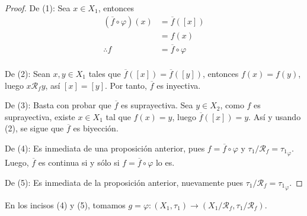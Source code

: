 \documentclass[12pt]{report}
\theoremstyle{largebreak}
\newcommand\cf[3]{\ensuremath{#1:#2\rightarrow#3}}
\begin{document}
    \begin{proof}
        De (1): Sea $x\in X_1$, entonces
        \begin{equation*}
            \begin{split}
                (\overline{f}\circ\varphi)(x)&=\overline{f}([x])\\
                &=f(x)\\
                \therefore f&=\overline{f}\circ\varphi\\
            \end{split}
        \end{equation*}

        De (2): Sean $x,y\in X_1$ tales que $\overline{f}([x])=\overline{f}([y])$, entonces $f(x)=f(y)$, luego $x\mathcal{R}_fy$, así $[x]=[y]$. Por tanto, $\overline{f}$ es inyectiva.

        De (3): Basta con probar que $\overline{f}$ es suprayectiva. Sea $y\in X_2$, como $f$ es suprayectiva, existe $x\in X_1$ tal que $f(x)=y$, luego $\overline{f}([x])=y$. Así y usando (2), se sigue que $\overline{f}$ es biyección.
        
        De (4): Es inmediata de una proposición anterior, pues $f=\overline{f}\circ\varphi$ y $\tau_1/\mathcal{R}_f={\tau_1}_{\varphi}$. Luego, $\overline{f}$ es continua si y sólo si $f=\overline{f}\circ\varphi$ lo es.

        De (5): Es inmediata de la proposición anterior, nuevamente pues $\tau_1/\mathcal{R}_f={\tau_1}_{\varphi}$.
    \end{proof}

    \begin{obs}
        En los incisos (4) y (5), tomamos $\cf{g=\varphi}{(X_1,\tau_1)}{(X_1/\mathcal{R}_f,\tau_1/\mathcal{R}_f)}$.
    \end{obs}
\end{document}
